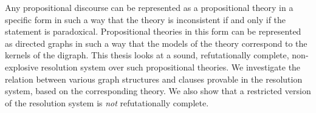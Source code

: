 Any propositional discourse can be represented as a propositional theory in a specific form in such a way that the theory is inconsistent if and only if the statement is paradoxical.
Propositional theories in this form can be represented as directed graphs in such a way that the models of the theory correspond to the kernels of the digraph.
This thesis looks at a sound, refutationally complete, non-explosive resolution system over such propositional theories.
We investigate the relation between various graph structures and clauses provable in the resolution system, based on the corresponding theory.
We also show that a restricted version of the resolution system is \textit{not} refutationally complete.
